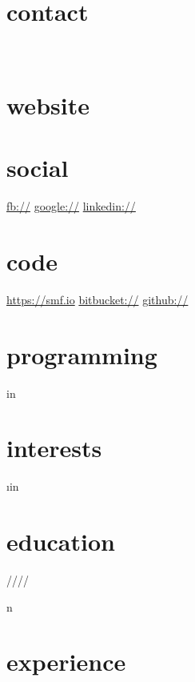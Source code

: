 \documentclass[]{fancy-cv}
\begin{document}
\header{\MakeLowercase\myfirstname}{\MakeLowercase\mylastname}
       {\MakeLowercase\mytitle}

\begin{aside}
  \section{contact}
    \href{mailto:\myemail}{\myemail}
    ~
    \myphone
    ~
    \myaddress%
    \mycity
  \section{website}
    \href{\mywebsite}{\mywebsite}
  \section{social}
    \href{http://facebook.com/\myfb}{fb://\myfb}
    \href{http://plug.google.com/\mygp}{google://\mygp}
    \href{http://www.linkedin.com/in/\mylinkedin}{linkedin://\mylinkedin}
  \section{code}
    \href{https://smf.io}{https://smf.io}
    \href{https://bitbucket.org/\myfb}{bitbucket://\myfb}
    \href{https://github.com/\myfb}{github://\myfb}
  \section{programming}
     \lang in \programming {%
      \lang
    }%
  \section{interests}
     \i in \interests {%
      \MakeLowercase\i
    }%
\end{aside}

\section{education}
\label{sec:education}

\begin{entrylist}
   \year/\degree/\school/\city/\subtitle in \education {
    \entry{\year}{\degree}{\school}{\subtitle}
  }
\end{entrylist}

\section{experience}
\label{sec:experience}
\end{document}
